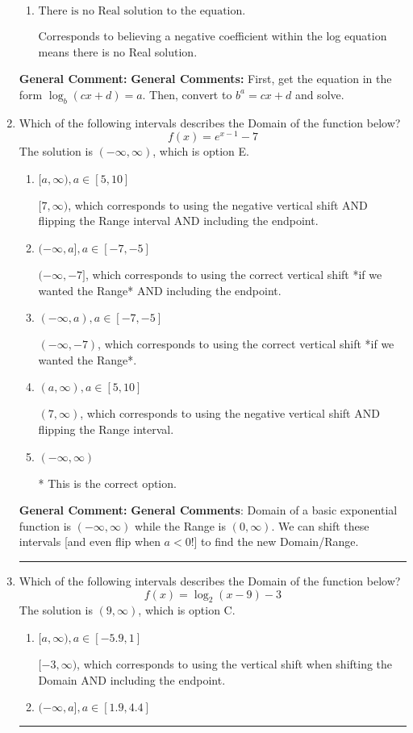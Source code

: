 \documentclass{extbook}[14pt]
\newcommand{\litem}[1]{\item #1

\rule{\textwidth}{0.4pt}}
\begin{document}
\begin{enumerate}
{\begin{enumerate}[label=\Alph*.]
* $x = -1.749$, which is the correct option.
\item \( \text{There is no Real solution to the equation.} \)

Corresponds to believing a negative coefficient within the log equation means there is no Real solution.
\end{enumerate}

\textbf{General Comment:} \textbf{General Comments:} First, get the equation in the form $\log_b{(cx+d)} = a$. Then, convert to $b^a = cx+d$ and solve.
}
\litem{
Which of the following intervals describes the Domain of the function below?
\[ f(x) = e^{x-1}-7 \]The solution is \( (-\infty, \infty) \), which is option E.\begin{enumerate}[label=\Alph*.]
\item \( [a, \infty), a \in [5, 10] \)

$[7, \infty)$, which corresponds to using the negative vertical shift AND flipping the Range interval AND including the endpoint.
\item \( (-\infty, a], a \in [-7, -5] \)

$(-\infty, -7]$, which corresponds to using the correct vertical shift *if we wanted the Range* AND including the endpoint.
\item \( (-\infty, a), a \in [-7, -5] \)

$(-\infty, -7)$, which corresponds to using the correct vertical shift *if we wanted the Range*.
\item \( (a, \infty), a \in [5, 10] \)

$(7, \infty)$, which corresponds to using the negative vertical shift AND flipping the Range interval.
\item \( (-\infty, \infty) \)

* This is the correct option.
\end{enumerate}

\textbf{General Comment:} \textbf{General Comments}: Domain of a basic exponential function is $(-\infty, \infty)$ while the Range is $(0, \infty)$. We can shift these intervals [and even flip when $a<0$!] to find the new Domain/Range.
}
\litem{
Which of the following intervals describes the Domain of the function below?
\[ f(x) = \log_2{(x-9)}-3 \]The solution is \( (9, \infty) \), which is option C.\begin{enumerate}[label=\Alph*.]
\item \( [a, \infty), a \in [-5.9, 1] \)

$[-3, \infty)$, which corresponds to using the vertical shift when shifting the Domain AND including the endpoint.
\item \( (-\infty, a], a \in [1.9, 4.4] \)


\end{enumerate}}
\end{enumerate}
\end{document}
